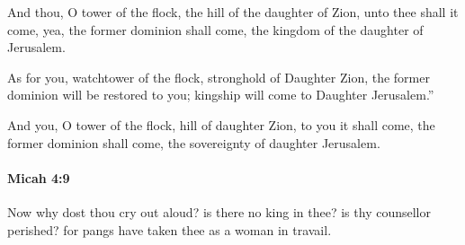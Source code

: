 			\begin{versebox}
					\item[BHS] 
					\item[LXX] 
					\item[ASV] And thou, O tower of the flock, the hill of the daughter of Zion, unto thee shall it come, yea, the former dominion shall come, the kingdom of the daughter of Jerusalem.
					\item[NIV] As for you, watchtower of the flock, stronghold of Daughter Zion, the former dominion will be restored to you; kingship will come to Daughter Jerusalem.”
					\item[NRSV] And you, O tower of the flock, hill of daughter Zion, to you it shall come, the former dominion shall come, the sovereignty of daughter Jerusalem.
			\end{versebox}

		\paragraph{Micah 4:9} %
			\label{MICAH-4-9}

			Now why dost thou cry out aloud? is there no king in thee? is thy counsellor perished? for pangs have taken thee as a woman in travail.


